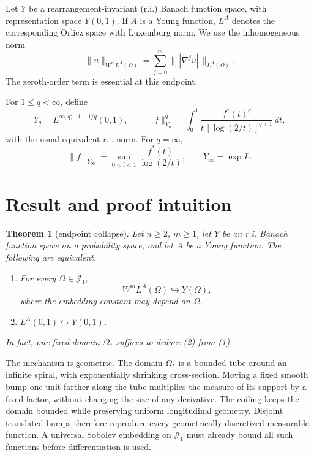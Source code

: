 \documentclass[11pt]{article}
\newtheorem{theorem}{Theorem}
\begin{document}
Let $Y$ be a rearrangement-invariant (r.i.) Banach function space, with
representation space $Y(0,1)$.  If $A$ is a Young function, $L^A$ denotes the
corresponding Orlicz space with Luxemburg norm.  We use the inhomogeneous norm
\[
 \|u\|_{W^mL^A(\Omega)}=\sum_{j=0}^m
                    \|\,|\nabla^j u|\,\|_{L^A(\Omega)}.
\]
The zeroth-order term is essential at this endpoint.

For $1\leq q<\infty$, define
\[
 Y_q=L^{\infty,q;-1-1/q}(0,1),\qquad
 \|f\|_{Y_q}^q=
 \int_0^1\frac{f^*(t)^q}{t\,[\log(2/t)]^{q+1}}\,dt,
\]
with the usual equivalent r.i. norm.  For $q=\infty$,
\[
 \|f\|_{Y_\infty}=\sup_{0<t<1}
       \frac{f^*(t)}{\log(2/t)},
 \qquad Y_\infty=\exp L.
\]

\section{Result and proof intuition}

\begin{theorem}[endpoint collapse]\label{thm:collapse}
Let $n\geq2$, $m\geq1$, let $Y$ be an r.i. Banach function space on a
probability space, and let $A$ be a Young function.  The following are
equivalent.
\begin{enumerate}
\item For every $\Omega\in\mathcal J_1$,
\[
 W^mL^A(\Omega)\hookrightarrow Y(\Omega),
\]
where the embedding constant may depend on $\Omega$.
\item $L^A(0,1)\hookrightarrow Y(0,1)$.
\end{enumerate}
In fact, one fixed domain $\Omega_*$ suffices to deduce (2) from (1).
\end{theorem}

The mechanism is geometric.  The domain $\Omega_*$ is a bounded tube around an
infinite spiral, with exponentially shrinking cross-section.  Moving a fixed
smooth bump one unit farther along the tube multiplies the measure of its
support by a fixed factor, without changing the size of any derivative.  The
coiling keeps the domain bounded while preserving uniform longitudinal
geometry.  Disjoint translated bumps therefore reproduce every geometrically
discretized measurable function.  A universal Sobolev embedding on
$\mathcal J_1$ must already bound all such functions before differentiation is
used.

\begin{center}
\end{center}
\end{document}
